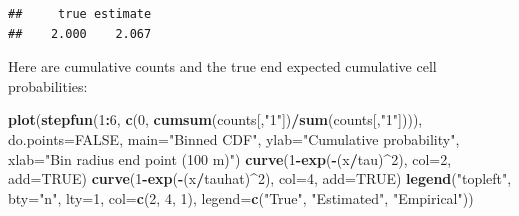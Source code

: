 \documentclass[12pt,]{book}
\newenvironment{Shaded}{\begin{snugshade}}{\end{snugshade}}
\newcommand{\DataTypeTok}[1]{\textcolor[rgb]{0.13,0.29,0.53}{#1}}
\newcommand{\DecValTok}[1]{\textcolor[rgb]{0.00,0.00,0.81}{#1}}
\newcommand{\KeywordTok}[1]{\textcolor[rgb]{0.13,0.29,0.53}{\textbf{#1}}}
\newcommand{\NormalTok}[1]{#1}
\newcommand{\OperatorTok}[1]{\textcolor[rgb]{0.81,0.36,0.00}{\textbf{#1}}}
\newcommand{\OtherTok}[1]{\textcolor[rgb]{0.56,0.35,0.01}{#1}}
\newcommand{\StringTok}[1]{\textcolor[rgb]{0.31,0.60,0.02}{#1}}
\begin{document}
\begin{Shaded}
\end{Shaded}

\begin{verbatim}
##     true estimate 
##    2.000    2.067
\end{verbatim}

Here are cumulative counts and the true end expected
cumulative cell probabilities:

\begin{Shaded}
\begin{Highlighting}[]
\KeywordTok{plot}\NormalTok{(}\KeywordTok{stepfun}\NormalTok{(}\DecValTok{1}\OperatorTok{:}\DecValTok{6}\NormalTok{, }\KeywordTok{c}\NormalTok{(}\DecValTok{0}\NormalTok{, }\KeywordTok{cumsum}\NormalTok{(counts[,}\StringTok{"1"}\NormalTok{])}\OperatorTok{/}\KeywordTok{sum}\NormalTok{(counts[,}\StringTok{"1"}\NormalTok{]))), }
  \DataTypeTok{do.points=}\OtherTok{FALSE}\NormalTok{, }\DataTypeTok{main=}\StringTok{"Binned CDF"}\NormalTok{,}
  \DataTypeTok{ylab=}\StringTok{"Cumulative probability"}\NormalTok{, }
  \DataTypeTok{xlab=}\StringTok{"Bin radius end point (100 m)"}\NormalTok{)}
\KeywordTok{curve}\NormalTok{(}\DecValTok{1}\OperatorTok{-}\KeywordTok{exp}\NormalTok{(}\OperatorTok{-}\NormalTok{(x}\OperatorTok{/}\NormalTok{tau)}\OperatorTok{^}\DecValTok{2}\NormalTok{), }\DataTypeTok{col=}\DecValTok{2}\NormalTok{, }\DataTypeTok{add=}\OtherTok{TRUE}\NormalTok{)}
\KeywordTok{curve}\NormalTok{(}\DecValTok{1}\OperatorTok{-}\KeywordTok{exp}\NormalTok{(}\OperatorTok{-}\NormalTok{(x}\OperatorTok{/}\NormalTok{tauhat)}\OperatorTok{^}\DecValTok{2}\NormalTok{), }\DataTypeTok{col=}\DecValTok{4}\NormalTok{, }\DataTypeTok{add=}\OtherTok{TRUE}\NormalTok{)}
\KeywordTok{legend}\NormalTok{(}\StringTok{"topleft"}\NormalTok{, }\DataTypeTok{bty=}\StringTok{"n"}\NormalTok{, }\DataTypeTok{lty=}\DecValTok{1}\NormalTok{, }\DataTypeTok{col=}\KeywordTok{c}\NormalTok{(}\DecValTok{2}\NormalTok{, }\DecValTok{4}\NormalTok{, }\DecValTok{1}\NormalTok{), }
  \DataTypeTok{legend=}\KeywordTok{c}\NormalTok{(}\StringTok{"True"}\NormalTok{, }\StringTok{"Estimated"}\NormalTok{, }\StringTok{"Empirical"}\NormalTok{))}
\end{Highlighting}
\end{Shaded}
\end{document}
